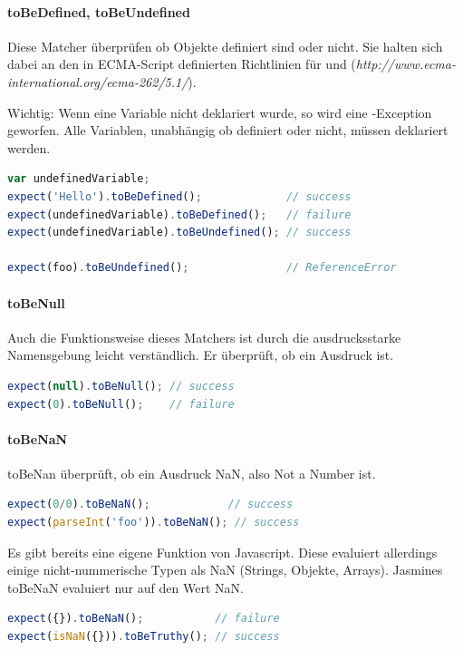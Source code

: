 \paragraph{toBeDefined, toBeUndefined}
Diese Matcher überprüfen ob Objekte definiert sind oder nicht. Sie halten sich dabei an den in ECMA-Script definierten Richtlinien für  und  (\textit{http://www.ecma-international.org/ecma-262/5.1/}).

Wichtig: Wenn eine Variable nicht deklariert wurde, so wird eine -Exception geworfen. Alle Variablen, unabhängig ob definiert oder nicht, müssen deklariert werden.
\begin{lstlisting}[language=JavaScript]
var undefinedVariable;
expect('Hello').toBeDefined();             // success
expect(undefinedVariable).toBeDefined();   // failure
expect(undefinedVariable).toBeUndefined(); // success

expect(foo).toBeUndefined();               // ReferenceError
\end{lstlisting}

\paragraph{toBeNull}
Auch die Funktionsweise dieses Matchers ist durch die ausdrucksstarke Namensgebung leicht verständlich. Er überprüft, ob ein Ausdruck  ist.
\begin{lstlisting}[language=JavaScript]
expect(null).toBeNull(); // success
expect(0).toBeNull();    // failure
\end{lstlisting}

\paragraph{toBeNaN}
toBeNan überprüft, ob ein Ausdruck NaN, also Not a Number ist.
\begin{lstlisting}[language=JavaScript]
expect(0/0).toBeNaN();            // success
expect(parseInt('foo')).toBeNaN(); // success
\end{lstlisting}

Es gibt bereits eine eigene  Funktion von Javascript. Diese evaluiert allerdings einige nicht-nummerische Typen als NaN (Strings, Objekte, Arrays). Jasmines toBeNaN evaluiert nur auf den Wert NaN.

\begin{lstlisting}[language=JavaScript]
expect({}).toBeNaN();           // failure
expect(isNaN({})).toBeTruthy(); // success
\end{lstlisting}

